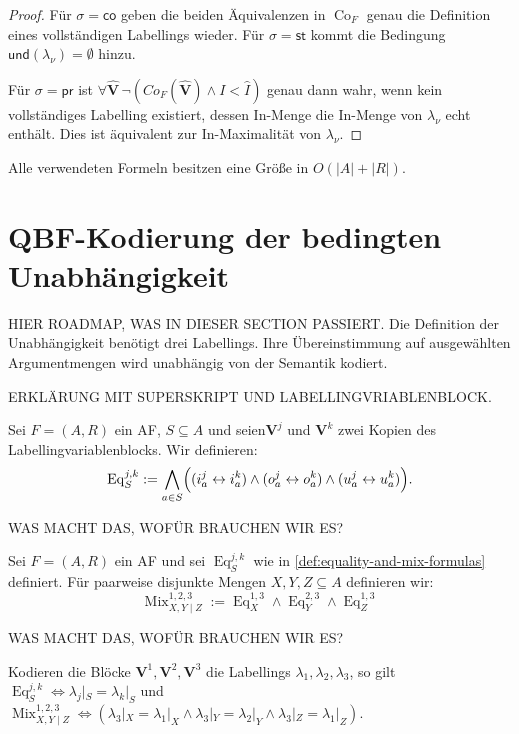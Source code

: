 \begin{proof}
    Für \(\sigma=\mathsf{co}\) geben die beiden Äquivalenzen in
    \(\operatorname{Co}_F\) genau die Definition eines vollständigen
    Labellings wieder. Für \(\sigma=\mathsf{st}\) kommt die Bedingung
    \(\mathsf{und}(\lambda_\nu)=\emptyset\) hinzu.

    Für \(\sigma=\mathsf{pr}\) ist
    \(\forall\widehat{\mathbf V}\,
        \neg ({Co}_F(\widehat{\mathbf V})
        \land I < \widehat{I})\) genau dann wahr, wenn kein vollständiges Labelling existiert,
    dessen In-Menge die In-Menge von \(\lambda_\nu\) echt enthält.
    Dies ist äquivalent zur In-Maximalität von \(\lambda_\nu\).
\end{proof}
Alle verwendeten Formeln besitzen eine Größe in
\(O(|A|+|R|)\).

\section{QBF-Kodierung der bedingten Unabhängigkeit}
\label{sec:uniform-independence-qbf}

HIER ROADMAP, WAS IN DIESER SECTION PASSIERT.
Die Definition der Unabhängigkeit benötigt drei Labellings. Ihre
Übereinstimmung auf ausgewählten Argumentmengen wird unabhängig von der
Semantik kodiert.

ERKLÄRUNG MIT SUPERSKRIPT UND LABELLINGVRIABLENBLOCK.
\begin{Definition}
    \label{def:equality-and-mix-formulas}
    Sei \(F =(A,R)\) ein AF, \(S\subseteq A\) und seien\(\mathbf V^j\) und \(\mathbf V^k\) zwei Kopien des
    Labellingvariablenblocks. Wir definieren:
    \[
        \operatorname{Eq}^{j,k}_S
        :=
        \bigwedge_{a\in S}
        \Bigl(
            (i_a^j\leftrightarrow i_a^k)
            \land(o_a^j\leftrightarrow o_a^k)
            \land(u_a^j\leftrightarrow u_a^k)
        \Bigr).
    \]
\end{Definition}
WAS MACHT DAS, WOFÜR BRAUCHEN WIR ES?
\begin{Definition}

    Sei \(F =(A,R)\) ein AF und sei \(\operatorname{Eq}^{j,k}_S\) wie in \ref{def:equality-and-mix-formulas} definiert.
    Für paarweise disjunkte Mengen \(X,Y,Z\subseteq A\) definieren wir:
    \[
        \operatorname{Mix}^{1,2,3}_{X,Y\mid Z}
        :=
        \operatorname{Eq}^{1,3}_X
        \land
        \operatorname{Eq}^{2,3}_Y
        \land
        \operatorname{Eq}^{1,3}_Z
    \]
\end{Definition}
WAS MACHT DAS, WOFÜR BRAUCHEN WIR ES?
\begin{Lemma}
    \label{lem:equality-and-mix-correct}
    Kodieren die Blöcke \(\mathbf V^1,\mathbf V^2,\mathbf V^3\) die
    Labellings \(\lambda_1,\lambda_2,\lambda_3\), so gilt
    \(
        \operatorname{Eq}^{j,k}_S
        \Longleftrightarrow
        \lambda_j|_S=\lambda_k|_S
    \)
    und
    \(
        \operatorname{Mix}^{1,2,3}_{X,Y\mid Z}
        \Longleftrightarrow
        \left(
        \lambda_3|_X=\lambda_1|_X
        \land
        \lambda_3|_Y=\lambda_2|_Y
        \land
        \lambda_3|_Z=\lambda_1|_Z
        \right).
    \)
\end{Lemma}

